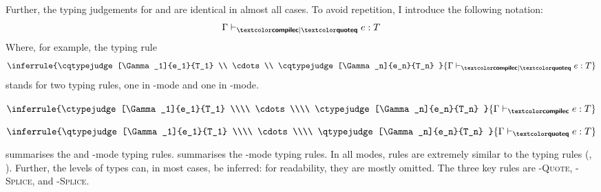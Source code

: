 \newcommand{\runtimecomptype}[2]{{#1} \, ! \, {#2}}
\newcommand{\compiletimetype}[1]{{#1}}
\newcommand{\compiletimecomptype}[2]{{#1} \, !  \,{#2}}

Further, the typing judgements for \compilemode{} and \quotemode{} are identical in almost all cases. To avoid repetition, I introduce the following notation:
\[\cqtypejudge{e}{T}\]
Where, for example, the typing rule 
\[\inferrule{\cqtypejudge[\Gamma_1]{e_1}{T_1} \\ \cdots \\ \cqtypejudge[\Gamma_n]{e_n}{T_n} }{\cqtypejudge{e}{T}}\]
stands for two typing rules, one in \compilemode{}-mode and one in \quotemode{}-mode.
\begin{center}
\begin{minipage}[t]{0.3\textwidth}
  \centering 
  $\inferrule{\ctypejudge[\Gamma_1]{e_1}{T_1} \\\\ \cdots \\\\ \ctypejudge[\Gamma_n]{e_n}{T_n} }{\ctypejudge{e}{T}}$
\end{minipage}%
\begin{minipage}[t]{0.3\textwidth}
  \centering
  $\inferrule{\qtypejudge[\Gamma_1]{e_1}{T_1} \\\\ \cdots \\\\ \qtypejudge[\Gamma_n]{e_n}{T_n} }{\qtypejudge{e}{T}}$
\end{minipage}
\end{center}

 summarises the \compilemode{} and \quotemode{}-mode typing rules.  summarises the \splicemode{}-mode typing rules. In all modes, rules are extremely similar to the \efflang{} typing rules (, ). Further, the levels of types can, in most cases, be inferred: for readability, they are mostly omitted. The three key rules are \textsc{\splicemode{}-Quote}, \textsc{\quotemode{}-Splice}, and \textsc{\compilemode{}-Splice}. 


